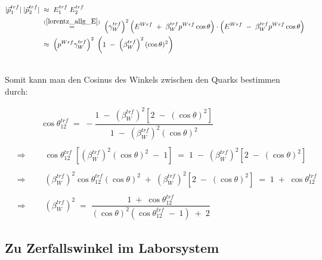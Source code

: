 \documentclass[
a4paper,                                %
twoside,                                %
BCOR1.4cm,                      %
ngerman,                                %
10pt,                           %
headings=normal,                %
headsepline,                    %
clearplainpage, %
final,                                  %
div=14,
parskip=full
]{scrbook}
\begin{document}
\begin{align}
	|\vec{p}_{1}^{trf}|\;|\vec{p}_{2}^{trf}|
\;&\approx\;
	E_{1}^{trf}\;E_{2}^{trf}
\nonumber
\\
\;&\stackrel{\mathrm{(\ref{lorentz_allg_E})}}=\;
	\left(\gamma_{W}^{trf}\right)^{2} \left(E^{Wrf}
	\;+\;\beta_{W}^{trf} p^{Wrf} \cos \theta \right) 
	\cdot \left(E^{Wrf}\;-\;\beta_{W}^{trf} p^{Wrf} \cos \theta \right)
\nonumber
\\
\;&\approx\;
	\left(p^{Wrf} \gamma_{W}^{trf} \right)^{2}\;
	\left( 1\;-\;\left(\beta_{W}^{trf}\right)^{2} (\cos \theta)^{2} \right)
\\
\nonumber
\end{align}

Somit kann man den Cosinus des Winkels zwischen den Quarks bestimmen durch: 

\begin{align}
	&\;\;\;\;\qquad \cos \theta_{1 2}^{trf}
\;=\;
	- \dfrac{1\;-\;\left(\beta_{W}^{trf}\right)^{2} \left[2
	\;-\;\left(\cos \theta \right)^{2}\right]}
	{1\;-\;\left(\beta_{W}^{trf}\right)^{2} \left(\cos \theta \right)^{2}}
\nonumber
\\
\nonumber
\\
	&\Rightarrow \qquad \cos \theta_{1 2}^{trf}
	\;\left[\left(\beta_{W}^{trf}\right)^{2} 
	\left(\cos \theta \right)^{2}\;-\;1\right]
\;=\;
	1\;-\;\left(\beta_{W}^{trf}\right)^{2} 
	\left[2\;-\;\left(\cos \theta \right)^{2}\right]
\nonumber
\\
\nonumber
\\
	&\Rightarrow \qquad \left(\beta_{W}^{trf}\right)^{2} \cos \theta_{1 2}^{trf} 
	\left(\cos \theta \right)^{2}
	\;+\;\left(\beta_{W}^{trf}\right)^{2} 
	\left[2\;-\;\left(\cos \theta \right)^{2}\right]
\;=\;
	1\;+\;\cos \theta_{1 2}^{trf}
\nonumber
\\
\nonumber
\\
	&\Rightarrow \qquad \left(\beta_{W}^{trf}\right)^{2}
\;=\;
	\dfrac{1\;+\;\cos \theta_{1 2}^{trf}}
	{\left(\cos \theta \right)^{2} 
	\left(\cos \theta_{1 2}^{trf}\;-\;1\right)\;+\;2}
\end{align}

\subsection{Zu Zerfallswinkel im Laborsystem}\label{anhangwinkellab}
\end{document}
